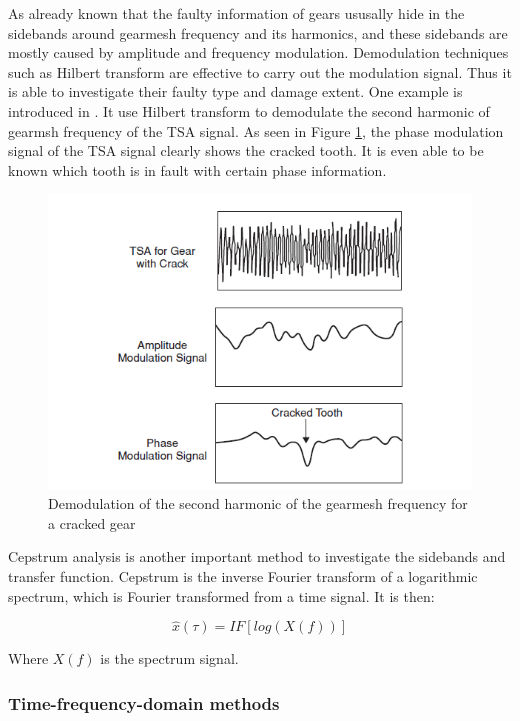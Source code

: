 As already known that the faulty information of gears ususally hide in the sidebands around gearmesh frequency and its harmonics, and these sidebands are mostly caused by amplitude and frequency modulation. Demodulation techniques such as Hilbert transform are effective to carry out the modulation signal. Thus it is able to investigate their faulty type and damage extent.
One example is introduced in \cite{mc4}. It use Hilbert transform to demodulate the second harmonic of gearmsh frequency of the TSA signal. As seen in Figure \ref{demodulation}, the phase modulation signal of the TSA signal clearly shows the cracked tooth. It is even able to be known which tooth is in fault with certain phase information.

\begin{figure}
	\centering
	\includegraphics{demodulation}
	\caption{Demodulation of the second harmonic of the gearmesh frequency for a cracked gear \cite{mc4}}
	\label{demodulation}
\end{figure}

Cepstrum analysis is another important method to investigate the sidebands and transfer function. Cepstrum is the inverse Fourier transform of a logarithmic spectrum, which is Fourier transformed from a time signal. It is then:

\begin{equation}
\hat{x}(\tau) = IF[log(X(f))]
\end{equation}

Where $X(f)$ is the spectrum signal.

\subsubsection{Time-frequency-domain methods}

